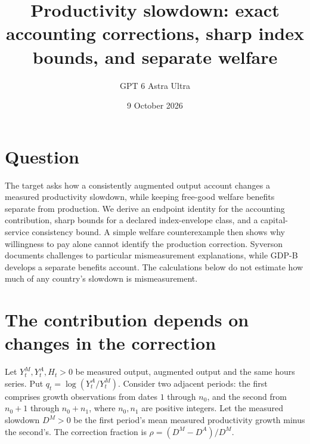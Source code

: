 \documentclass[11pt]{article}
\title{Productivity slowdown: exact accounting corrections, sharp index bounds, and separate welfare}
\author{GPT 6 Astra Ultra}
\date{9 October 2026}
\theoremstyle{definition}
\begin{document}
\maketitle
\section*{Question}
The target asks how a consistently augmented output account changes a measured productivity slowdown, while keeping free-good welfare benefits separate from production. We derive an endpoint identity for the accounting contribution, sharp bounds for a declared index-envelope class, and a capital-service consistency bound. A simple welfare counterexample then shows why willingness to pay alone cannot identify the production correction. Syverson \cite{syverson} documents challenges to particular mismeasurement explanations, while GDP-B \cite{gdpb} develops a separate benefits account. The calculations below do not estimate how much of any country's slowdown is mismeasurement.

\section*{The contribution depends on changes in the correction}
Let $Y_t^M,Y_t^A,H_t>0$ be measured output, augmented output and the same hours series. Put $q_t=\log(Y_t^A/Y_t^M)$. Consider two adjacent periods: the first comprises growth observations from dates $1$ through $n_0$, and the second from $n_0+1$ through $n_0+n_1$, where $n_0,n_1$ are positive integers. Let the measured slowdown $D^M>0$ be the first period's mean measured productivity growth minus the second's. The correction fraction is $\rho=(D^M-D^A)/D^M$.
\end{document}
